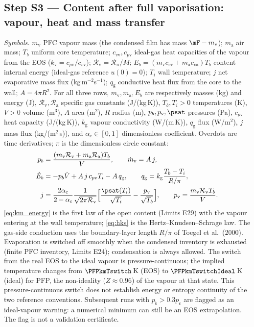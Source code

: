 \subsection{Step S3 --- Content after full vaporisation: vapour, heat and mass transfer}
\emph{Symbols.} $m_{\mathrm v}$ PFC vapour mass (the condensed film has mass $\mF-m_{\mathrm v}$); $m_{\mathrm a}$
air mass; $T_b$ uniform core temperature; $c_{v\mathrm v},c_{p\mathrm v}$ ideal-gas heat capacities of the
vapour from the EOS ($k_{\mathrm v}=c_{p\mathrm v}/c_{v\mathrm v}$); $\mathcal R_{\mathrm v}=\mathcal R_u/M$;
$E_b=(m_{\mathrm v}c_{v\mathrm v}+m_{\mathrm a}c_{v\mathrm a})T_b$ content internal energy (ideal-gas reference
$u(0)=0$); $T_i$ wall temperature; $j$ net evaporative mass flux (kg\,m$^{-2}$s$^{-1}$); $q_{\mathrm g}$
conductive heat flux from the core to the wall; $A=4\pi R^2$.
For all three rows, $m_{\mathrm v},m_{\mathrm a},E_b$ are respectively masses (kg) and energy (J),
$\mathcal R_{\mathrm v},\mathcal R_{\mathrm a}$ specific gas constants (J/(kg\,K)),
$T_b,T_i>0$ temperatures (K), $V>0$ volume (m$^3$), $A$ area (m$^2$), $R$ radius (m),
$p_b,p_{\mathrm v},\psat$ pressures (Pa), $c_{p\mathrm v}$ heat capacity (J/(kg\,K)),
$k_{\mathrm g}$ vapour conductivity (W/(m\,K)), $q_{\mathrm g}$ flux (W/m$^2$),
$j$ mass flux (kg/(m$^2$\,s)), and $\alpha_{\mathrm c}\in[0,1]$ dimensionless coefficient.
Overdots are time derivatives; $\pi$ is the dimensionless circle constant:
\begin{align}
p_b&=\frac{(m_{\mathrm v}\mathcal R_{\mathrm v}+m_{\mathrm a}\mathcal R_{\mathrm a})T_b}{V},\qquad
\dot m_{\mathrm v}=A\,j,\label{eq:content}\\
\dot E_b&=-p_b\dot V+A\,j\,c_{p\mathrm v}T_i-A\,q_{\mathrm g},\qquad
q_{\mathrm g}=k_{\mathrm g}\frac{T_b-T_i}{R/\pi},\label{eq:km_energy}\\
j&=\frac{2\alpha_{\mathrm c}}{2-\alpha_{\mathrm c}}\frac{1}{\sqrt{2\pi\mathcal R_{\mathrm v}}}
\Bigl[\frac{\psat(T_i)}{\sqrt{T_i}}-\frac{p_{\mathrm v}}{\sqrt{T_b}}\Bigr],\qquad p_{\mathrm v}=\frac{m_{\mathrm v}\mathcal R_{\mathrm v}T_b}{V}.\label{eq:hks}
\end{align}
\eqref{eq:km_energy} is the first law of the open content (Limits E29) with the vapour entering at the
wall temperature; \eqref{eq:hks} is the Hertz--Knudsen--Schrage law. The gas-side conduction uses the
boundary-layer length $R/\pi$ of Toegel et al.\ (2000). Evaporation is switched off smoothly when the
condensed inventory is exhausted (finite PFC inventory, Limits E24); condensation is always allowed.
The switch from the real EOS to the ideal vapour is pressure-continuous; the implied temperature
changes from $\PFPkmTswitch$\,K (EOS) to $\PFPkmTswitchIdeal$\,K (ideal) for PFP, the non-ideality
($Z\approx0.96$) of the vapour at that state. This pressure-continuous switch does not establish
energy or entropy continuity of the two reference conventions. Subsequent runs with
$p_b>0.3p_{\mathrm c}$ are flagged as an ideal-vapour warning: a numerical minimum can still be
an EOS extrapolation. The flag is not a validation certificate.

